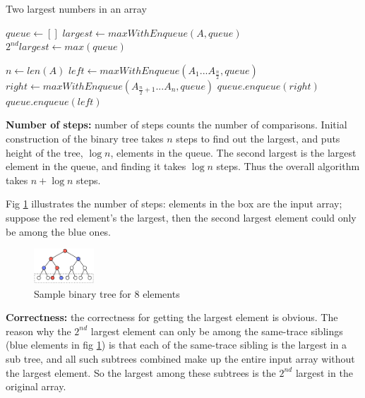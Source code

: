 \documentclass{article}
\begin{document}
\begin{description}
  \begin{algorithm}[H]
  \caption{Two largest numbers in an array}
  \label{alg:largest-second-largest-number}
    \begin{algorithmic}[1]
    
      \State $queue \gets []$
      \State $largest \gets maxWithEnqueue(A, queue)$
      \State $2^{nd}largest \gets max(queue)$
      \State {}
    \EndFunction

        \State {}
      \EndIf
      \State $n \gets len(A)$
      \State $left \gets maxWithEnqueue(A_1...A_{\frac{n}{2}}, queue)$
      \State $right \gets maxWithEnqueue(A_{\frac{n}{2} + 1}...A_n, queue)$
        \State $queue.enqueue(right)$
        \State {}
      \Else
        \State $queue.enqueue(left)$
        \State {}
      \EndIf
    \EndFunction

    \end{algorithmic}
  \end{algorithm}

  \textbf{Number of steps:} number of steps counts the number of comparisons. Initial construction of the binary tree takes $n$ steps to find out the largest, and puts height of the tree, $\log n$, elements in the queue. The second largest is the largest element in the queue, and finding it takes $\log n$ steps. Thus the overall algorithm takes $n + \log n$ steps. 

  Fig \ref{fig:pb2} illustrates the number of steps: elements in the box are the input array; suppose the red element's the largest, then the second largest element could only be among the blue ones. 

  \begin{figure}[h]
  \centering
  \includegraphics[width=0.2\textwidth]{hw72tree}
  \caption{Sample binary tree for 8 elements}
  \label{fig:pb2}
  \end{figure}

  \textbf{Correctness:} the correctness for getting the largest element is obvious. The reason why the $2^{nd}$ largest element can only be among the same-trace siblings (blue elements in fig \ref{fig:pb2}) is that each of the same-trace sibling is the largest in a sub tree, and all such subtrees combined make up the entire input array without the largest element. So the largest among these subtrees is the $2^{nd}$ largest in the original array.


\end{description}
\end{document}
